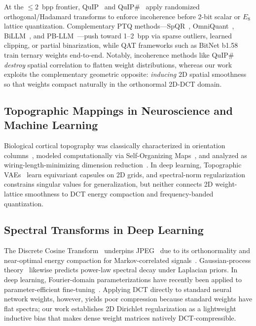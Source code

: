 \documentclass[11pt,a4paper]{article}
\begin{document}
At the $\le 2$~bpp frontier, QuIP~\citep{chee2023quip} and QuIP\#~\citep{tseng2024quipsharp} apply randomized orthogonal/Hadamard transforms to enforce incoherence before 2-bit scalar or $E_8$ lattice quantization. Complementary PTQ methods---SpQR~\citep{dettmers2023spqr}, OmniQuant~\citep{shao2024omniquant}, BiLLM~\citep{huang2024billm}, and PB-LLM~\citep{shang2024pbllm}---push toward 1--2~bpp via sparse outliers, learned clipping, or partial binarization, while QAT frameworks such as BitNet b1.58~\citep{ma2024bitnet} train ternary weights end-to-end. Notably, incoherence methods like QuIP\# \emph{destroy} spatial correlation to flatten weight distributions, whereas our work exploits the complementary geometric opposite: \emph{inducing} 2D spatial smoothness so that weights compact naturally in the orthonormal 2D-DCT domain.

\subsection{Topographic Mappings in Neuroscience and Machine Learning}
Biological cortical topography was classically characterized in orientation columns~\citep{hubel1962receptive}, modeled computationally via Self-Organizing Maps~\citep{kohonen1982self}, and analyzed as wiring-length-minimizing dimension reduction~\citep{durbin1990dimension}. In deep learning, Topographic VAEs~\citep{keller2021topographic} learn equivariant capsules on 2D grids, and spectral-norm regularization~\citep{yoshida2017spectral} constrains singular values for generalization, but neither connects 2D weight-lattice smoothness to DCT energy compaction and frequency-banded quantization.

\subsection{Spectral Transforms in Deep Learning}
The Discrete Cosine Transform~\citep{ahmed1974dct} underpins JPEG~\citep{wallace1992jpeg} due to its orthonormality and near-optimal energy compaction for Markov-correlated signals~\citep{strang1999dct}. Gaussian-process theory~\citep{rasmussen2006gp} likewise predicts power-law spectral decay under Laplacian priors. In deep learning, Fourier-domain parameterizations have recently been applied to parameter-efficient fine-tuning~\citep[FourierFT;][]{gao2024fourierft}. Applying DCT directly to standard neural network weights, however, yields poor compression because standard weights have flat spectra; our work establishes 2D Dirichlet regularization as a lightweight inductive bias that makes dense weight matrices natively DCT-compressible.
\end{document}
